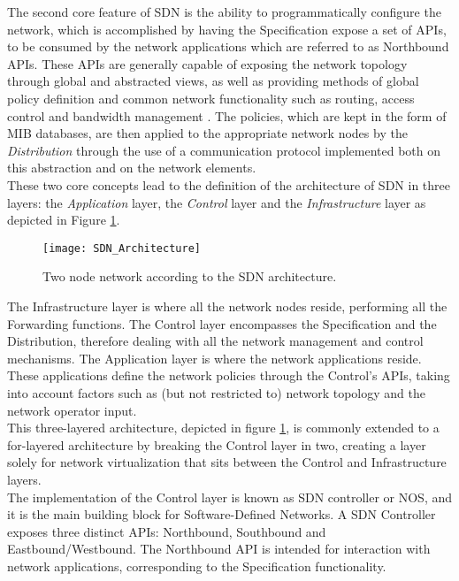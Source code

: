 %
The second core feature of \gls{SDN} is the ability to programmatically configure the network, which is accomplished by having the Specification expose a set of \glspl{API}, to be consumed by the network applications which are referred to as Northbound \glspl{API}.
These \glspl{API} are generally capable of exposing the network topology through global and abstracted views, as well as providing methods of global policy definition and common network functionality such as routing, access control and bandwidth management \cite{OFWP}.
The policies, which are kept in the form of \gls{MIB} databases, are then applied to the appropriate network nodes by the \emph{Distribution} through the use of a communication protocol implemented both on this abstraction and on the network elements.\\
%
These two core concepts lead to the definition of the architecture of \gls{SDN} in three layers: the \emph{Application} layer, the \emph{Control} layer and the \emph{Infrastructure} layer \cite{OpenNetworkingFoundation}\cite{Kreutz2014} as depicted in Figure \ref{fig:SDN_Architecture}.
\begin{figure}
	\centering
	\texttt{[image: SDN\_Architecture]}
	\caption{Two node network according to the SDN architecture.}
	\label{fig:SDN_Architecture}
\end{figure}
The Infrastructure layer is where all the network nodes reside, performing all the Forwarding functions.
The Control layer encompasses the Specification and the Distribution, therefore dealing with all the network management and control mechanisms.
The Application layer is where the network applications reside.
These applications define the network policies through the Control's \glspl{API}, taking into account factors such as (but not restricted to) network topology and the network operator input.\\
This three-layered architecture, depicted in figure \ref{fig:SDN_Architecture}, is commonly extended to a for-layered architecture by breaking the Control layer in two, creating a layer solely for network virtualization that sits between the Control and Infrastructure layers.\\
%
The implementation of the Control layer is known as \gls{SDN} controller or \gls{NOS}, and it is the main building block for Software-Defined Networks.
A \gls{SDN} Controller exposes three distinct \glspl{API}: Northbound, Southbound and Eastbound/Westbound.
The Northbound \gls{API} is intended for interaction with network applications, corresponding to the Specification functionality. 
